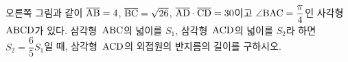 \noindent\begin{minipage}[t]{0.58\linewidth}\vspace{0pt}\raggedright 오른쪽 그림과 같이 $\overline{\mathrm{AB}}=4$, $\overline{\mathrm{BC}}=\sqrt{26}$, $\overline{\mathrm{AD}}\cdot\overline{\mathrm{CD}}=30$이고 $\angle\mathrm{BAC}=\dfrac{\pi}{4}$인 사각형~$\mathrm{ABCD}$가 있다. 삼각형~$\mathrm{ABC}$의 넓이를 $S_1$, 삼각형~$\mathrm{ACD}$의 넓이를 $S_2$라 하면 $S_2=\dfrac{6}{5}S_1$일 때, 삼각형~$\mathrm{ACD}$의 외접원의 반지름의 길이를 구하시오.\end{minipage}\hfill\begin{minipage}[t]{0.4\linewidth}\vspace{0pt}\centering \resizebox{\ifdim\width>\linewidth\linewidth\else\width\fi}{!}{}\end{minipage}\par
